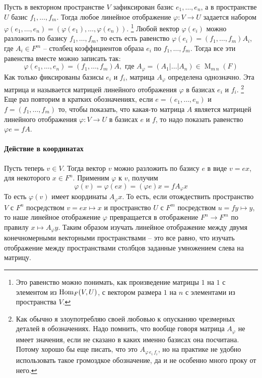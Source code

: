 Пусть в векторном пространстве $V$ зафиксирован базис $e_1,\ldots,e_n$, а в пространстве $U$ базис $f_1,\ldots, f_m$.
Тогда любое линейное отображение $\varphi\colon V\to U$ задается набором $\varphi(e_1,\ldots,e_n) = (\varphi(e_1),\ldots, \varphi(e_n))$.%
\footnote{Это равенство можно понимать, как произведение матрицы $1$ на $1$ с элементом из $\operatorname{Hom}_F(V,U)$, с вектором размера $1$ на $n$ с элементами из пространства $V$.}
Любой вектор $\varphi(e_i)$ можно разложить по базису $f_1,\ldots,f_m$, то есть есть равенство $\varphi(e_i) = (f_1,\ldots,f_m)A_i$, где $A_i\in F^m$ -- столбец коэффициентов образа $e_i$ по $f_1,\ldots,f_m$.
Тогда все эти равенства вместе можно записать так:
\[
\varphi(e_1,\ldots,e_n) = (f_1,\ldots,f_m)A, \text{ где } A_\varphi = (A_1|\ldots|A_n)\in \operatorname{M}_{m\,n}(F)
\]
Как только фиксированы базисы $e_i$ и $f_i$, матрица $A_\varphi$ определена однозначно.
Эта матрица и называется матрицей линейного отображения $\varphi$ в базисах $e_i$ и $f_i$.%
\footnote{Как обычно я злоупотребляю своей любовью к опусканию чрезмерных деталей в обозначениях.
Надо помнить, что вообще говоря матрица $A_\varphi$ не имеет значения, если не сказано в каких именно базисах она посчитана.
Потому хорошо бы еще писать, что это $A_{\varphi\,e_i\,f_i}$, но на практике не удобно использовать такое громоздкое обозначение, да и не особенно много проку от него.}
Еще раз повторим в кратких обозначениях, если $e=(e_1,\ldots,e_n)$ и $f = (f_1,\ldots,f_m)$ то, чтобы показать, что какая-то матрица $A$ является матрицей линейного отображения $\varphi\colon V\to U$ в базисах $e$ и $f$, то надо показать равенство $\varphi e = f A$.

\paragraph{Действие в координатах}

Пусть теперь $v\in V$.
Тогда вектор $v$ можно разложить по базису $e$ в виде $v = ex$, для некоторого $x\in F^n$.
Применим $\varphi$ к $v$, получим
\[
\varphi(v) = \varphi(ex) = (\varphi e)x = f A_\varphi x
\]
То есть $\varphi(v)$ имеет координаты $A_\varphi x$.
То есть, если отождествить пространство $V$ с $F^n$ посредством $v = ex \mapsto x$ и пространство $U$ с $F^m$ посредством $u = fy \mapsto y$, то наше линейное отображение $\varphi$ превращается в отображение $F^n \to F^m$ по правилу $x \mapsto A_\varphi y$.
Таким образом изучать линейное отображение между двумя конечномерными векторными пространствами -- это все равно, что изучать отображение между пространствами столбцов заданные умножением слева на матрицу.


